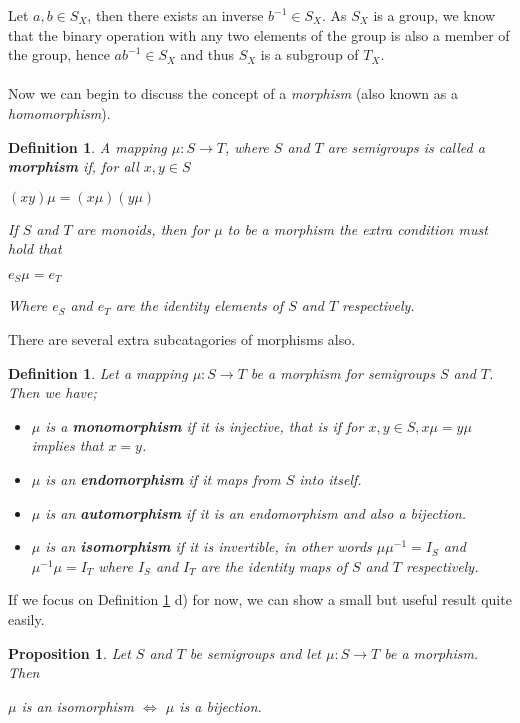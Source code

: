 \documentclass[12pt]{article}
\newtheorem{defn}[theorem]{Definition}
\newtheorem{prop}[theorem]{Proposition}
\begin{document}
Let $a, b \in S_X$, then there exists an inverse $b^{-1} \in S_X$. As $S_X$ is a group, we know that the binary operation with any two elements of the group is also a member of the group, hence $ab^{-1} \in S_X$ and thus $S_X$ is a subgroup of $T_X$.\\
\\Now we can begin to discuss the concept of a \textit{morphism} (also known as a \textit{homomorphism}).
\begin{defn}
	A mapping $\mu:S\to T$, where $S$ and $T$ are semigroups is called a \textbf{morphism} if, for all $x, y \in S$
	\begin{center}
		$(xy)\mu = (x\mu)(y\mu)$
	\end{center}
	If $S$ and $T$ are monoids, then for $\mu$ to be a morphism the extra condition must hold that
	\begin{center}
		$e_S\mu=e_T$
	\end{center}
	Where $e_S$ and $e_T$ are the identity elements of $S$ and $T$ respectively.
\end{defn}
\noindent There are several extra subcatagories of morphisms also.
\begin{defn}\label{def2.13}
	Let a mapping $\mu:S\to T$ be a morphism for semigroups $S$ and $T$. Then we have;
	\indent
	\begin{itemize}
		\item[a)] $\mu$ is a \textbf{monomorphism} if it is injective, that is if for $x, y \in S, x\mu = y\mu$ implies that $x = y$.
		\item[b)] $\mu$ is an \textbf{endomorphism} if it maps from $S$ into itself.
		\item[c)] $\mu$ is an \textbf{automorphism} if it is an endomorphism and also a bijection.
		\item[d)] $\mu$ is an \textbf{isomorphism} if it is invertible, in other words $\mu\mu^{-1} = I_S$ and $\mu^{-1}\mu = I_T$ where $I_S$ and $I_T$ are the identity maps of $S$ and $T$ respectively.
	\end{itemize}
\end{defn}
\noindent If we focus on Definition \ref{def2.13} d) for now, we can show a small but useful result quite easily.
\begin{prop}\label{prop2.14}
	Let $S$ and $T$ be semigroups and let $\mu:S\to T$ be a morphism. Then 
	\begin{center}
		$\mu$ is an isomorphism $\iff$ $\mu$ is a bijection.
	\end{center}
\end{prop}
\end{document}
